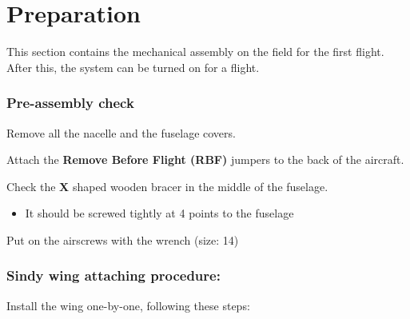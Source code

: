 \section{Preparation}\label{i.-preparation}

This section contains the mechanical assembly on the field for the first flight. After this, the system can be turned on for a flight.

\subsubsection*{Pre-assembly check}\label{pre-assembly-check}

      \begin{todolist}
      \item Remove all the nacelle and the fuselage covers.
      \item Attach the \textbf{Remove Before Flight (RBF)} jumpers to the back of
        the aircraft.
      \item Check the \textbf{X} shaped wooden bracer in the middle of the
        fuselage.

        \begin{itemize}
        \itemsep1pt\parskip0pt
        \item   It should be screwed tightly at 4 points to the fuselage
        \end{itemize}
        \item
          Put on the airscrews with the wrench (size: 14)
      \end{todolist}

\subsubsection*{Sindy wing attaching procedure:}\label{sindy-wing-attaching-procedure}

      Install the wing one-by-one, following these steps:

